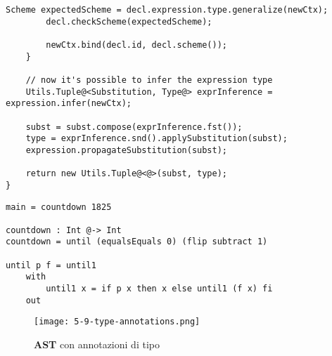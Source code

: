 \begin{lstlisting}[caption={Metodo di inferenza per espressioni \texttt{let}}, style=javaCode, label={lst:5-9-let-inference-java}]
        Scheme expectedScheme = decl.expression.type.generalize(newCtx);
        decl.checkScheme(expectedScheme);

        newCtx.bind(decl.id, decl.scheme());
    }

    // now it's possible to infer the expression type
    Utils.Tuple@<Substitution, Type@> exprInference = expression.infer(newCtx);

    subst = subst.compose(exprInference.fst());
    type = exprInference.snd().applySubstitution(subst);
    expression.propagateSubstitution(subst);

    return new Utils.Tuple@<@>(subst, type);
}
\end{lstlisting}

\newpage

\begin{lstlisting}[caption={Esempio di inferenza}, style=funxCode, label={lst:5-9-types-funx}]
main = countdown 1825

countdown : Int @-> Int
countdown = until (equalsEquals 0) (flip subtract 1) 

until p f = until1
    with
        until1 x = if p x then x else until1 (f x) fi
    out    
\end{lstlisting}

\begin{figure}
    \vspace{4mm}
    \texttt{[image: 5-9-type-annotations.png]}
    \caption{\textbf{AST} con annotazioni di tipo}
    \label{fig:5-9-type-annotations}
\end{figure}
